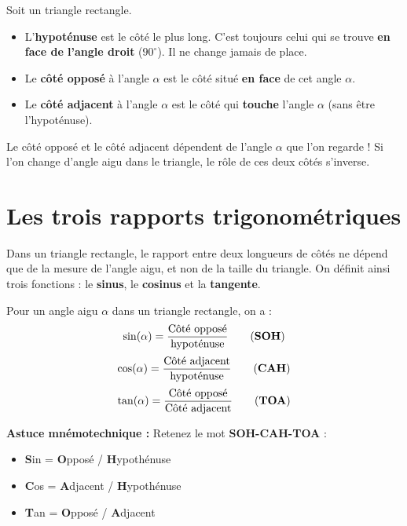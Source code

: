 \documentclass[11pt,a4paper]{article}
\begin{document}
\begin{definition}
Soit un triangle rectangle.
\begin{itemize}
  \item L'\textbf{hypoténuse} est le côté le plus long. C'est toujours celui qui se trouve \textbf{en face de l'angle droit} ($90^\circ$). Il ne change jamais de place.
  \item Le \textbf{côté opposé} à l'angle $\alpha$ est le côté situé \textbf{en face} de cet angle $\alpha$.
  \item Le \textbf{côté adjacent} à l'angle $\alpha$ est le côté qui \textbf{touche} l'angle $\alpha$ (sans être l'hypoténuse).
\end{itemize}
\end{definition}

\begin{attention}
Le côté opposé et le côté adjacent dépendent de l'angle $\alpha$ que l'on regarde ! Si l'on change d'angle aigu dans le triangle, le rôle de ces deux côtés s'inverse.
\end{attention}

\section{Les trois rapports trigonométriques}

Dans un triangle rectangle, le rapport entre deux longueurs de côtés ne dépend que de la mesure de l'angle aigu, et non de la taille du triangle. On définit ainsi trois fonctions : le \textbf{sinus}, le \textbf{cosinus} et la \textbf{tangente}.

\begin{propriete}
Pour un angle aigu $\alpha$ dans un triangle rectangle, on a :
\[
\sin(\alpha) = \frac{\text{Côté opposé}}{\text{hypoténuse}} \qquad (\text{\textbf{SOH}})
\]
\[
\cos(\alpha) = \frac{\text{Côté adjacent}}{\text{hypoténuse}} \qquad (\text{\textbf{CAH}})
\]
\[
\tan(\alpha) = \frac{\text{Côté opposé}}{\text{Côté adjacent}} \qquad (\text{\textbf{TOA}})
\]
\end{propriete}

\textbf{Astuce mnémotechnique :} Retenez le mot \textbf{SOH-CAH-TOA} :
\begin{itemize}
  \item \textbf{S}in = \textbf{O}pposé / \textbf{H}ypothénuse
  \item \textbf{C}os = \textbf{A}djacent / \textbf{H}ypothénuse
  \item \textbf{T}an = \textbf{O}pposé / \textbf{A}djacent
\end{itemize}
\end{document}
